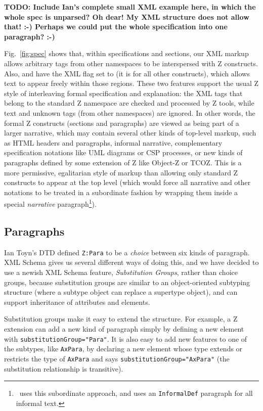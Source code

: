 \documentclass{llncs}  %
\newcommand{\TODO}[1]{\textbf{TODO: #1}}   %
\begin{document}
\TODO{Include Ian's complete small XML example here, in which
  the whole spec is unparsed?  Oh dear!  My XML structure does not
  allow that!  :-)  Perhaps we could put the whole specification into
  one paragraph?   :-)}

Fig.~\ref{fig:spec} shows that, within specifications and sections, our XML
markup allows arbitrary tags from other namespaces to be interspersed with
Z constructs.  Also,  and  have the XML
 flag set to  (it is  for all other
constructs), which allows text to appear freely within those regions.
These two features support the usual Z style of interleaving formal
specification and explanation: the XML tags that belong to the standard Z
namespace are checked and processed by Z tools, while text and unknown tags
(from other namespaces) are ignored.  In other words, the formal Z
constructs (sections and paragraphs) are viewed as being part of a
larger narrative, which may contain several
other kinds of top-level markup, such as HTML headers and paragraphs,
informal narrative, complementary specification notations like UML diagrams
or CSP processes, or new kinds of paragraphs defined by some extension of Z
like Object-Z or TCOZ.  This is a more permissive, egalitarian style of
markup than allowing only standard Z constructs to appear at the top level
(which would force all narrative and other notations to be treated in a
subordinate fashion by wrapping them inside a special \emph{narrative}
paragraph\footnote{\CADiZ\ uses this subordinate approach, and uses an
  \texttt{InformalDef} paragraph for all informal text.}).


\subsection{Paragraphs}

Ian Toyn's DTD defined \verb!Z:Para! to be a \emph{choice} between six
kinds of paragraph.  XML Schema gives us several different ways of doing
this, and we have decided to use a newish XML Schema feature,
\emph{Substitution Groups}, rather than choice groups, because substitution
groups are similar to an object-oriented subtyping structure (where a
subtype object can replace a supertype object), and can support inheritance
of attributes and elements.   

Substitution groups make it easy to extend the structure.  For example, a Z
extension can add a new kind of paragraph simply by defining a new
element with \texttt{substitutionGroup="Para"}.  It is also easy to add new
features to one of the subtypes, like \texttt{AxPara}, by declaring a new
element whose type extends or restricts the type of \texttt{AxPara} and
says \texttt{substitutionGroup="AxPara"} (the substitution relationship is
transitive).
\end{document}
